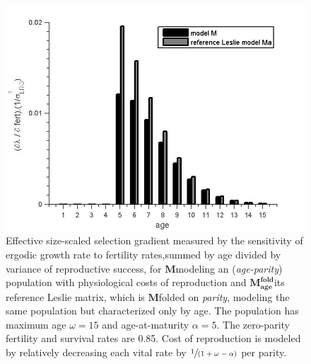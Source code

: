 \documentclass[10pt,a4paper]{article}
\newcommand{\M}{$\mathbf{M}$}
\newcommand{\Ma}{$\mathbf{M^{fold}_{age}}$}
\begin{document}
\begin{figure}[hbtp]%
\centering
\includegraphics[scale=.25]{scaledselgradbyvar.jpg}
\caption{Effective size-scaled selection gradient  measured by the sensitivity of ergodic growth rate to fertility rates,summed by age divided by variance of reproductive success, for \M modeling an (\emph{age-parity}) population with physiological costs of reproduction and \Ma its reference Leslie matrix, which is \M folded on \emph{parity}, modeling the same population but characterized only by age. The population has maximum age $\omega=15$ and age-at-maturity $\alpha=5$. The zero-parity fertility and survival rates are 0.85. Cost of reproduction is modeled by relatively decreasing each vital rate by $\sfrac{1}{(1+\omega -\alpha)}$ per parity.}
\label{fig:scaledselgradbyvar}
\end{figure}
\end{document}

